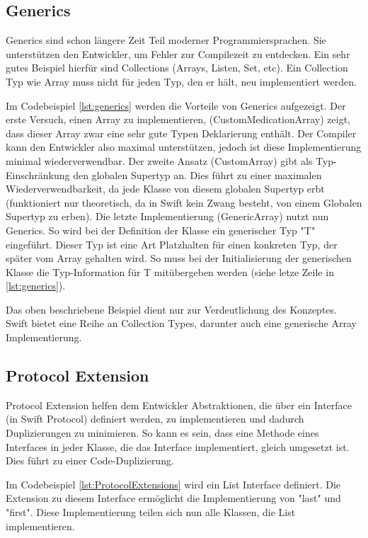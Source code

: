 \subsection{Generics}
Generics sind schon längere Zeit Teil moderner Programmiersprachen. Sie unterstützen den Entwickler, um Fehler zur Compilezeit zu entdecken. Ein sehr gutes Beispiel hierfür sind Collections (Arrays, Listen, Set, etc). Ein Collection Typ wie Array muss nicht für jeden Typ, den er hält, neu implementiert werden.

Im Codebeispiel \ref{lst:generics} werden die Vorteile von Generics aufgezeigt. Der erste Versuch, einen Array zu implementieren, (CustomMedicationArray) zeigt, dass dieser Array zwar eine sehr gute Typen Deklarierung enthält. Der Compiler kann den Entwickler also maximal unterstützen, jedoch ist diese Implementierung minimal wiederverwendbar. Der zweite Ansatz (CustomArray) gibt als Typ-Einschränkung den globalen Supertyp an. Dies führt zu einer maximalen Wiederverwendbarkeit, da jede Klasse von diesem globalen Supertyp erbt (funktioniert nur theoretisch, da in Swift kein Zwang besteht, von einem Globalen Supertyp zu erben).
Die letzte Implementierung (GenericArray) nutzt nun Generics. So wird bei der Definition der Klasse ein generischer Typ "T" eingeführt. Dieser Typ ist eine Art Platzhalten für einen konkreten Typ, der später vom Array gehalten wird. So muss bei der Initialisierung der generischen Klasse die Typ-Information für T mitübergeben werden (siehe letze Zeile in \ref{lst:generics}).

Das oben beschriebene Beispiel dient nur zur Verdeutlichung des Konzeptes. Swift bietet eine Reihe an Collection Types, darunter auch eine generische Array Implementierung. 

\subsection{Protocol Extension}
Protocol Extension helfen dem Entwickler Abstraktionen, die über ein Interface (in Swift Protocol) definiert werden, zu implementieren und dadurch Duplizierungen zu minimieren. So kann es sein, dass eine Methode eines Interfaces in jeder Klasse, die das Interface implementiert, gleich umgesetzt ist. Dies führt zu einer Code-Duplizierung. 

Im Codebeispiel \ref{lst:ProtocolExtensions} wird ein List Interface definiert. Die Extension zu diesem Interface ermöglicht die Implementierung von "last" und "first". Diese Implementierung teilen sich nun alle Klassen, die List implementieren.

